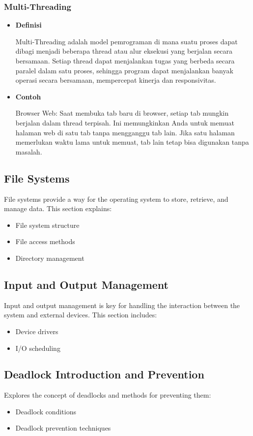 \documentclass[12pt]{article}
\begin{document}
\subsubsection{Multi-Threading}
\begin{itemize}
    \item\textbf{Definisi}
    \par \hspace{2em} Multi-Threading adalah model pemrograman di mana suatu proses dapat dibagi menjadi beberapa thread atau alur eksekusi yang berjalan secara bersamaan. Setiap thread dapat menjalankan tugas yang berbeda secara paralel dalam satu proses, sehingga program dapat menjalankan banyak operasi secara bersamaan, mempercepat kinerja dan responsivitas.
    \item\textbf{Contoh} 
    \par \hspace{2em} Browser Web: Saat membuka tab baru di browser, setiap tab mungkin berjalan dalam thread terpisah. Ini memungkinkan Anda untuk memuat halaman web di satu tab tanpa mengganggu tab lain. Jika satu halaman memerlukan waktu lama untuk memuat, tab lain tetap bisa digunakan tanpa masalah.
\end{itemize}

\subsection{File Systems}
File systems provide a way for the operating system to store, retrieve, and manage data. This section explains:
\begin{itemize}
    \item File system structure
    \item File access methods
    \item Directory management
\end{itemize}

\subsection{Input and Output Management}
Input and output management is key for handling the interaction between the system and external devices. This section includes:
\begin{itemize}
    \item Device drivers
    \item I/O scheduling
\end{itemize}

\subsection{Deadlock Introduction and Prevention}
Explores the concept of deadlocks and methods for preventing them:
\begin{itemize}
    \item Deadlock conditions
    \item Deadlock prevention techniques
\end{itemize}
\end{document}
